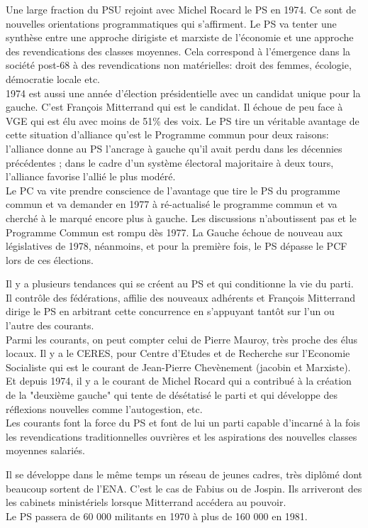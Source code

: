 \documentclass[10pt, a4paper, openany]{book}
\begin{document}
Une large fraction du PSU rejoint avec Michel Rocard le PS en 1974. Ce sont de nouvelles orientations programmatiques qui s'affirment. Le PS va tenter une synthèse entre une approche dirigiste et marxiste de l'économie et une approche des revendications des classes moyennes. Cela correspond à l'émergence dans la société post-68 à des revendications non matérielles: droit des femmes, écologie, démocratie locale etc. \\
1974 est aussi une année d'élection présidentielle avec un candidat unique pour la gauche. C'est François Mitterrand qui est le candidat. Il échoue de peu face à VGE qui est élu avec moins de 51\% des voix. Le PS tire un véritable avantage de cette situation d'alliance qu'est le Programme commun pour deux raisons: l'alliance donne au PS l'ancrage à gauche qu'il avait perdu dans les décennies précédentes ; dans le cadre d'un système électoral majoritaire à deux tours, l'alliance favorise l'allié le plus modéré. \\
Le PC va vite prendre conscience de l'avantage que tire le PS du programme commun et va demander en 1977 à ré-actualisé le programme commun et va cherché à le marqué encore plus à gauche. Les discussions n'aboutissent pas et le Programme Commun est rompu dès 1977. La Gauche échoue de nouveau aux législatives de 1978, néanmoins, et pour la première fois, le PS dépasse le PCF lors de ces élections.


Il y a plusieurs tendances qui se créent au PS et qui conditionne la vie du parti. Il contrôle des fédérations, affilie des nouveaux adhérents et François Mitterrand dirige le PS en arbitrant cette concurrence en s'appuyant tantôt sur l'un ou l'autre des courants. \\
Parmi les courants, on peut compter celui de Pierre Mauroy, très proche des élus locaux. Il y a le CERES, pour Centre d'Etudes et de Recherche sur l'Economie Socialiste qui est le courant de Jean-Pierre Chevènement (jacobin et Marxiste). Et depuis 1974, il y a le courant de Michel Rocard qui a contribué à la création de la "deuxième gauche" qui tente de désétatisé le parti et qui développe des réflexions nouvelles comme l'autogestion, etc. \\
Les courants font la force du PS et font de lui un parti capable d'incarné à la fois les revendications traditionnelles ouvrières et les aspirations des nouvelles classes moyennes salariés.


Il se développe dans le même temps un réseau de jeunes cadres, très diplômé dont beaucoup sortent de l'ENA. C'est le cas de Fabius ou de Jospin. Ils arriveront des les cabinets ministériels lorsque Mitterrand accédera au pouvoir. \\
Le PS passera de 60 000 militants en 1970 à plus de 160 000 en 1981. 
\end{document}
